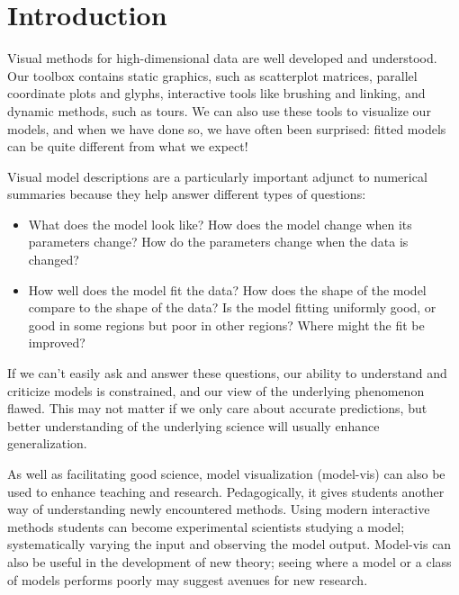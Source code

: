 \documentclass[preprint]{imsart}
\begin{document}
\section{Introduction}

Visual methods for high-dimensional data are well developed and understood. Our toolbox contains static graphics, such as scatterplot matrices, parallel coordinate plots and glyphs, interactive tools like brushing and linking, and dynamic methods, such as tours. We can also use these tools to visualize our models, and when we have done so, we have often been surprised: fitted models can be quite different from what we expect!

Visual model descriptions are a particularly important adjunct to numerical summaries because they help answer different types of questions:

\begin{itemize} \itemsep 0in

\item What does the model look like? How does the model change when
  its parameters change? How do the parameters change when the
  data is changed?

\item How well does the model fit the data? How does the shape of the
  model compare to the shape of the data?  Is the model fitting
  uniformly good, or good in some regions but poor in other regions?
  Where might the fit be improved?

\end{itemize}

\noindent If we can't easily ask and answer these questions, our ability to understand and criticize models is constrained, and our view of the underlying phenomenon flawed. This may not matter if we only care about accurate predictions, but better understanding of the underlying science will usually enhance generalization.

As well as facilitating good science, model visualization (model-vis) can also be used to enhance teaching and research. Pedagogically, it gives students another way of understanding newly encountered methods. Using modern interactive methods students can become experimental scientists studying a model; systematically varying the input and observing the model output. Model-vis can also be useful in the development of new theory; seeing where a model or a class of models performs poorly may suggest avenues for new research.

\end{document}
